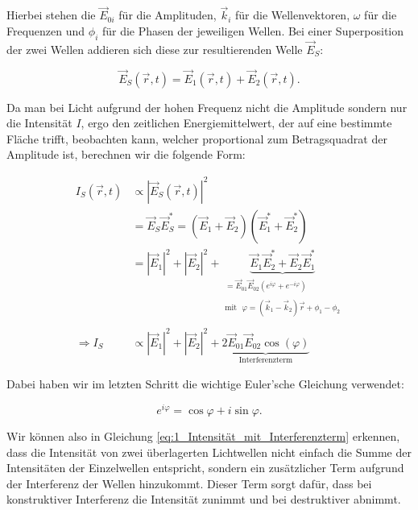 \documentclass{article}
\begin{document}
Hierbei stehen die $\Vec{E}_{0i}$ für die Amplituden, $\Vec{k}_i$ für die Wellenvektoren, $\omega$ für die Frequenzen und $\phi_i$ für die Phasen der jeweiligen Wellen. Bei einer Superposition der zwei Wellen addieren sich diese zur resultierenden Welle $\Vec{E}_S$:

\begin{equation}
    \Vec{E}_S (\Vec{r}, t) = \Vec{E}_1 (\Vec{r}, t) + \Vec{E}_2 (\Vec{r}, t).
\end{equation}

Da man bei Licht aufgrund der hohen Frequenz nicht die Amplitude sondern nur die Intensität $I$, ergo den zeitlichen Energiemittelwert, der auf eine bestimmte Fläche trifft, beobachten kann, welcher proportional zum Betragsquadrat der Amplitude ist, berechnen wir die folgende Form:

\begin{equation}
    \begin{split}
        I_S (\Vec{r}, t) &\propto | \Vec{E}_S (\Vec{r}, t) |^2 \\
        &= \Vec{E}_S \Vec{E}_S^* = (\Vec{E}_1 + \Vec{E}_2)(\Vec{E}_1^* + \Vec{E}_2^*) \\
        &= | \Vec{E}_1 |^2 + | \Vec{E}_2 |^2 + \underbrace{\Vec{E}_1 \Vec{E}_2^* + \Vec{E}_2 \Vec{E}_1^*}_{\begin{array}{c}= \Vec{E}_{01} \Vec{E}_{02} (e^{i\varphi} + e^{-i\varphi})\\ \\[-0.5ex] \text{mit} \ \ \ \varphi = (\Vec{k}_1 - \Vec{k}_2) \Vec{r} + \phi_1 - \phi_2 \end{array}} \\ \\
        \Rightarrow I_S &\propto | \Vec{E}_1 |^2 + | \Vec{E}_2 |^2 + \underbrace{2 \Vec{E}_{01} \Vec{E}_{02} \cos{(\varphi)}}_{\text{Interferenzterm}}
    \end{split}
    \label{eq:1_Intensität_mit_Interferenzterm}
\end{equation}

Dabei haben wir im letzten Schritt die wichtige Euler'sche Gleichung verwendet:

\begin{equation}
    e^{i\varphi} = \cos{\varphi} + i \sin{\varphi}.
    \label{eq:1_euler}
\end{equation}

Wir können also in Gleichung \ref{eq:1_Intensität_mit_Interferenzterm} erkennen, dass die Intensität von zwei überlagerten Lichtwellen nicht einfach die Summe der Intensitäten der Einzelwellen entspricht, sondern ein zusätzlicher Term aufgrund der Interferenz der Wellen hinzukommt. Dieser Term sorgt dafür, dass bei konstruktiver Interferenz die Intensität zunimmt und bei destruktiver abnimmt.   
\end{document}
